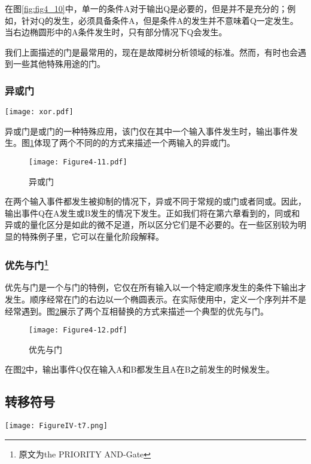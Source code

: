 \documentclass[cn,11pt,chinese]{elegantbook}
\begin{document}
在图\ref{fig:fig4_10}中，单一的条件A对于输出Q是必要的，但是并不是充分的；例如，针对Q的发生，必须具备条件A，但是条件A的发生并不意味着Q一定发生。当右边椭圆形中的A条件发生时，只有部分情况下Q会发生。

我们上面描述的门是最常用的，现在是故障树分析领域的标准。然而，有时也会遇到一些其他特殊用途的门。

\subsubsection{异或门}

\texttt{[image: xor.pdf]}

异或门是或门的一种特殊应用，该门仅在其中一个输入事件发生时，输出事件发生。图\ref{fig:fig4_11}体现了两个不同的的方式来描述一个两输入的异或门。

\begin{figure}[H]
	\centering
	\texttt{[image: Figure4-11.pdf]}
	\caption{异或门}\label{fig:fig4_11}
\end{figure}

在两个输入事件都发生被抑制的情况下，异或不同于常规的或门或者同或。因此，输出事件Q在A发生或B发生的情况下发生。正如我们将在第六章看到的，同或和异或的量化区分是如此的微不足道，所以区分它们是不必要的。在一些区别较为明显的特殊例子里，它可以在量化阶段解释。

\subsubsection{优先与门\footnote{原文为the PRIORITY AND-Gate}} 



优先与门是一个与门的特例，它仅在所有输入以一个特定顺序发生的条件下输出才发生。顺序经常在门的右边以一个椭圆表示。在实际使用中，定义一个序列并不是经常遇到。图\ref{fig:fig4_12}展示了两个互相替换的方式来描述一个典型的优先与门。

\begin{figure}[h]
	\centering
	\texttt{[image: Figure4-12.pdf]}
	\caption{优先与门}\label{fig:fig4_12}
\end{figure}

在图\ref{fig:fig4_12}中，输出事件Q仅在输入A和B都发生且A在B之前发生的时候发生。

\subsection{转移符号}


\texttt{[image: FigureIV-t7.png]}
\end{document}
